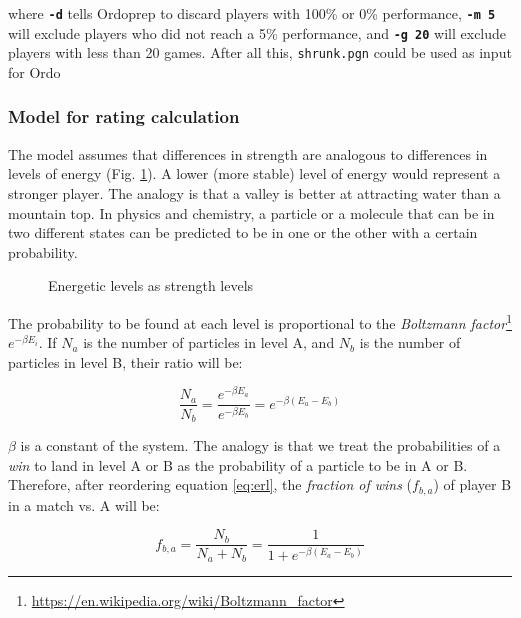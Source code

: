 \documentclass[12pt]{article}
\newcommand{\swtch} [1] {\texttt{\textbf{#1}}}
\newcommand{\filename} [1] {\texttt{#1}}
\begin{document}
where \swtch{-d} tells Ordoprep to discard players with 100\% or 0\% performance, \swtch{-m~5}
will exclude players who did not reach a 5\% performance, and \swtch{-g~20} will exclude players with less than 20 games.
After all this, \filename{shrunk.pgn} could be used as input for Ordo

\subsubsection*{Model for rating calculation}

The model assumes that differences in strength are analogous to differences in levels of energy (Fig. \ref{fig:figlevels1}). 
A lower (more stable) level of energy would represent a stronger player.
The analogy is that a valley is better at attracting water than a mountain top. 
In physics and chemistry, a particle or a molecule that can be in two different states can be predicted to be in one or the other with a certain probability.

	\begin{figure}[htb]
	\caption{\label{fig:figlevels1} Energetic levels as strength levels}
	\end{figure}

The probability to be found at each level is proportional to the 
\textit{Boltzmann factor}\footnote{\url{https://en.wikipedia.org/wiki/Boltzmann_factor}} $e^{-\beta E_{i}}$.
If $N_{a}$ is the number of particles in level A, and $N_{b}$ is the number of particles in level B, their ratio will be:

	\begin{equation} \label{eq:erl}
	\frac{N_{a}}{N_{b}} = \frac{ e^{-\beta E_{a}} }{ e^{-\beta E_{b}} } = e^{-\beta(E_{a}-E_{b})}
	\end{equation}

$\beta$ is a constant of the system.
The analogy is that we treat the probabilities of a \textit{win} to land in level A or B as the probability of a particle to be in A or B.
Therefore, after reordering equation \ref{eq:erl}, the \textit{fraction of wins} ($f_{b,a}$) of player B in a match vs. A will be:

	\begin{equation}
	f_{b,a}  = \frac{ N_{b} }{ N_{a}+N_{b} }  =     \frac{1}{1 + e^{-\beta(E_{a}-E_{b})}}  
	\end{equation}
\end{document}
